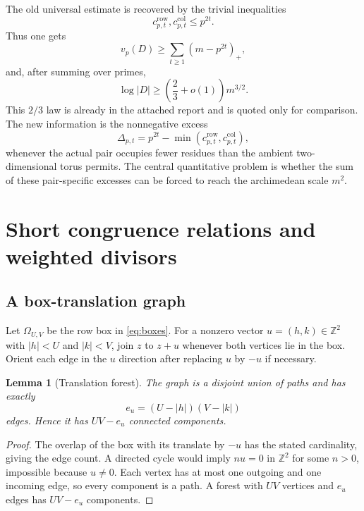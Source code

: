 \documentclass[11pt]{article}
\newtheorem{lemma}[theorem]{Lemma}
\theoremstyle{definition}
\theoremstyle{remark}
\newcommand{\Z}{\mathbb Z}
\newcommand{\vp}{v_p}
\newcommand{\crow}{c^{\mathrm{row}}}
\newcommand{\ccol}{c^{\mathrm{col}}}
\begin{document}
The old universal estimate is recovered by the trivial inequalities
\[
\crow_{p,t},\ccol_{p,t}\le p^{2t}.
\]
Thus one gets
\[
\vp(D)\ge\sum_{t\ge1}(m-p^{2t})_+,
\]
and, after summing over primes,
\[
\log|D|\ge \left(\frac23+o(1)\right)m^{3/2}.
\]
This $2/3$ law is already in the attached report and is quoted only for comparison.  The new information is the nonnegative excess
\begin{equation}\label{eq:pair-specific-excess}
\Delta_{p,t}
=p^{2t}-\min(\crow_{p,t},\ccol_{p,t}),
\end{equation}
whenever the actual pair occupies fewer residues than the ambient two-dimensional torus permits.  The central quantitative problem is whether the sum of these pair-specific excesses can be forced to reach the archimedean scale $m^2$.

\section{Short congruence relations and weighted divisors}\label{sec:gcd}

\subsection{A box-translation graph}

Let $\Omega_{U,V}$ be the row box in \eqref{eq:boxes}.  For a nonzero vector $u=(h,k)\in\Z^2$ with $|h|<U$ and $|k|<V$, join $z$ to $z+u$ whenever both vertices lie in the box.  Orient each edge in the $u$ direction after replacing $u$ by $-u$ if necessary.

\begin{lemma}[Translation forest]\label{lem:translation-forest}
The graph is a disjoint union of paths and has exactly
\begin{equation}\label{eq:edge-count}
e_u=(U-|h|)(V-|k|)
\end{equation}
edges.  Hence it has $UV-e_u$ connected components.
\end{lemma}

\begin{proof}
The overlap of the box with its translate by $-u$ has the stated cardinality, giving the edge count.  A directed cycle would imply $nu=0$ in $\Z^2$ for some $n>0$, impossible because $u\ne0$.  Each vertex has at most one outgoing and one incoming edge, so every component is a path.  A forest with $UV$ vertices and $e_u$ edges has $UV-e_u$ components.
\end{proof}
\end{document}

